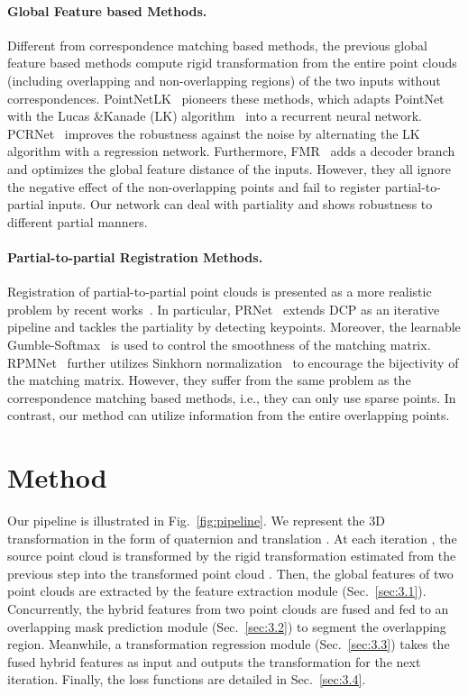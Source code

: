 \documentclass[10pt,twocolumn,letterpaper]{article}
\begin{document}
\paragraph{Global Feature based Methods.}
Different from correspondence matching based methods, the previous global feature based methods compute rigid transformation from the entire point clouds (including overlapping and non-overlapping regions) of the two inputs without correspondences. PointNetLK~\cite{aoki2019pointnetlk} pioneers these methods, which adapts PointNet~\cite{qi2017pointnet} with the Lucas \&Kanade (LK) algorithm~\cite{lucas1981iterative} into a recurrent neural network. PCRNet~\cite{sarode2019pcrnet} improves the robustness against the noise by alternating the LK algorithm with a regression network. Furthermore, FMR~\cite{huang2020feature} adds a decoder branch and optimizes the global feature distance of the inputs. However, they all ignore the negative effect of the non-overlapping points and fail to register partial-to-partial inputs. Our network can deal with partiality and shows robustness to different partial manners.

\vspace{-0.35cm}
\paragraph{Partial-to-partial Registration Methods.}Registration of partial-to-partial point clouds is presented as a more realistic problem by recent works~\cite{wang2019prnet, yew2020-RPMNet, idam}. In particular, PRNet~\cite{wang2019prnet} extends DCP as an iterative pipeline and tackles the partiality by detecting keypoints. Moreover, the learnable Gumble-Softmax~\cite{jang2016categorical} is used to control the smoothness of the matching matrix. RPMNet~\cite{yew2020-RPMNet} further utilizes Sinkhorn normalization~\cite{sinkhorn1964relationship} to encourage the bijectivity of the matching matrix. However, they suffer from the same problem as the correspondence matching based methods, i.e., they can only use sparse points. In contrast, our method can utilize information from the entire overlapping points. 
\section{Method} \label{sec:3}
Our pipeline is illustrated in Fig.~\ref{fig:pipeline}. We represent the 3D transformation in the form of quaternion  and translation .
At each iteration , the source point cloud  is transformed by the rigid transformation  estimated from the previous step into the transformed point cloud . Then, the global features of two point clouds are extracted by the feature extraction module (Sec.~\ref{sec:3.1}). Concurrently, the hybrid features from two point clouds are fused and fed to an overlapping mask prediction module (Sec.~\ref{sec:3.2}) to segment the overlapping region. Meanwhile, a transformation regression module (Sec.~\ref{sec:3.3}) takes the fused hybrid features as input and outputs the transformation  for the next iteration. Finally, the loss functions are detailed in Sec.~\ref{sec:3.4}.
\end{document}
